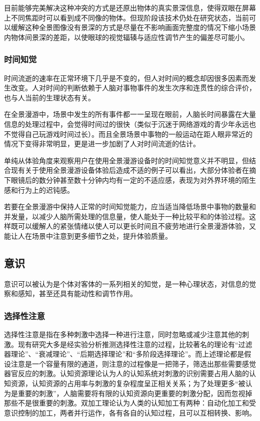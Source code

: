 目前能够完美解决这种冲突的方式是还原出物体的真实景深信息，使得双眼在屏幕上不同焦距时可以看到成不同像的物体。但现阶段该技术仍处在研究状态，当前可以缓解这种全景图像没有景深的方式是尽量在不影响画面完整度的情况下缩小场景内物体间景深的差距，以使眼球的视觉辐辏与适应性调节产生的偏差尽可能小。

\subsubsection{时间知觉}
时间流逝的速率在正常环境下几乎是不变的，但人对时间的概念却因很多因素而发生改变。人对时间的判断依赖于人脑对事物事件的发生次序和连贯性的综合评价，也与人当前的生理状态有关。

在全景漫游中，场景中发生的所有事件都一一呈现在眼前，人脑长时间暴露在大量信息的处理过程中，会觉得时间过的很快（类似于沉迷于网络游戏的青少年永远也不觉得自己玩游戏时间过长）。而且全景场景中事物的一般运动在距人眼非常近的情况下变得非常明显，更是进一步加剧了人对时间流逝的估计。

单纯从体验角度来观察用户在使用全景漫游设备时的时间知觉意义并不明显，但结合现有关于使用全景漫游设备体验后造成不适的例子可以看出，大部分体验者在摘下眼镜后的数分钟甚至数十分钟内均有一定的不适应感，表现为对外界环境的陌生感和行为上的迟钝感。

若要在全景漫游中保持人正常的时间知觉能力，应当适当降低场景中事物的数量和并发量，以减少人脑所需处理的信息量，使人能处于一种比较平和的体验过程。这样既可以缓解人的紧张情绪以使人可以更长时间且不疲劳地进行全景漫游体验，又能让人在场景中注意到更多细节之处，提升体验质量。

\subsection{意识}
意识可以被认为是个体对客体的一系列相关的知觉，是一种心理状态，对信息的觉察和感知，甚至还具有能动性和调节作用。

\subsubsection{选择性注意}
选择性注意是指在多种刺激中选择一种进行注意，同时忽略或减少注意其他的刺激。现有研究大多是经实验分析推测选择性注意的过程，比较著名的理论有“过滤器理论”、“衰减理论”、“后期选择理论”和“多阶段选择理论”。而上述理论都是假设注意是一个容量有限的通道，则注意的过程像是一把筛子，筛选出那些需要感觉器官反应的刺激。认知资源理论认为人的认知系统对刺激的识别需要占用人脑的认知资源，认知资源的占用率与刺激的复杂程度呈正相关关系；为了处理更多“被认为是重要的刺激”，人脑需要将有限的认知资源向更重要的刺激分配，因而忽视掉那些不是很重要的刺激。双加工理论认为人类的认知加工有两种：自动化加工和受意识控制的加工，两者并行运作，各有各自的认知过程，且可以互相转换、影响。

